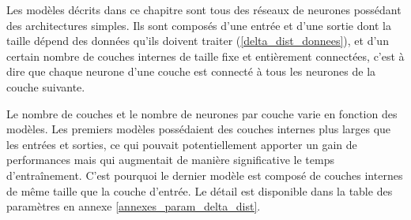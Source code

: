 \par Les modèles décrits dans ce chapitre sont tous des réseaux de neurones possédant des architectures simples. Ils sont composés d'une entrée et d'une sortie dont la taille dépend des données qu'ils doivent traiter (\ref{delta_dist_donnees}), et d'un certain nombre de couches internes de taille fixe et entièrement connectées, c'est à dire que chaque neurone d'une couche est connecté à tous les neurones de la couche suivante.

\par Le nombre de couches et le nombre de neurones par couche varie en fonction des modèles. Les premiers modèles possédaient des couches internes plus larges que les entrées et sorties, ce qui pouvait potentiellement apporter un gain de performances mais qui augmentait de manière significative le temps d'entraînement. C'est pourquoi le dernier modèle est composé de couches internes de même taille que la couche d'entrée. Le détail est disponible dans la table des paramètres en annexe \ref{annexes_param_delta_dist}.